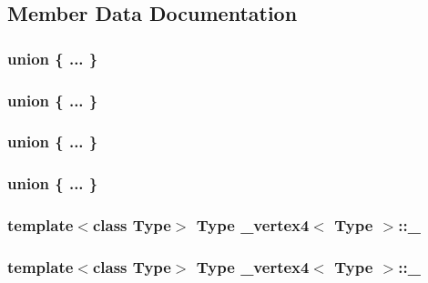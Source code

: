 \subsection{Member Data Documentation}
\hypertarget{class__vertex4_ace50a28d1947b55e8320c2d6d9357a53}{\subsubsection[{"@11}]{\setlength{\rightskip}{0pt plus 5cm}union \{ ... \} }}\label{class__vertex4_ace50a28d1947b55e8320c2d6d9357a53}
\hypertarget{class__vertex4_a58573aec2b21f5f8847f249b08ed1a06}{\subsubsection[{"@13}]{\setlength{\rightskip}{0pt plus 5cm}union \{ ... \} }}\label{class__vertex4_a58573aec2b21f5f8847f249b08ed1a06}
\hypertarget{class__vertex4_a937d6b630a10567e28fc9a908153cfbf}{\subsubsection[{"@15}]{\setlength{\rightskip}{0pt plus 5cm}union \{ ... \} }}\label{class__vertex4_a937d6b630a10567e28fc9a908153cfbf}
\hypertarget{class__vertex4_a327f4644f527b94b21efac763ff56515}{\subsubsection[{"@17}]{\setlength{\rightskip}{0pt plus 5cm}union \{ ... \} }}\label{class__vertex4_a327f4644f527b94b21efac763ff56515}
\hypertarget{class__vertex4_a09a23b8ca3bc04a31fcd0ed54b81e0ac}{
\subsubsection[{\+\_\+0}]{\setlength{\rightskip}{0pt plus 5cm}template$<$class Type$>$ Type {\bf \+\_\+vertex4}$<$ Type $>$\+::\+\_}}\label{class__vertex4_a09a23b8ca3bc04a31fcd0ed54b81e0ac}
\hypertarget{class__vertex4_aaf6e97bf9baa67997950774fab3ed2a3}{
\subsubsection[{\+\_\+1}]{\setlength{\rightskip}{0pt plus 5cm}template$<$class Type$>$ Type {\bf \+\_\+vertex4}$<$ Type $>$\+::\+\_}}\label{class__vertex4_aaf6e97bf9baa67997950774fab3ed2a3}

